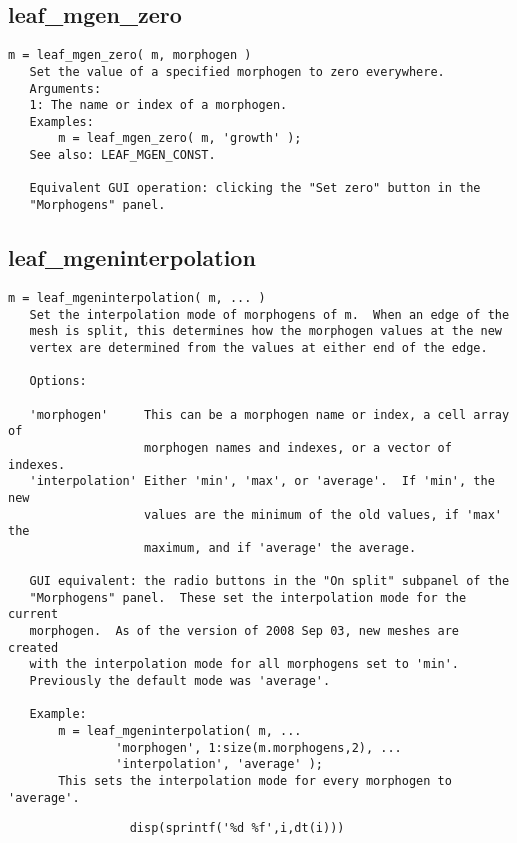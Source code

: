 \subsection{leaf\_mgen\_zero}\label{section-leaf-mgen-zero}

\begin{verbatim}
m = leaf_mgen_zero( m, morphogen )
   Set the value of a specified morphogen to zero everywhere.
   Arguments:
   1: The name or index of a morphogen.
   Examples:
       m = leaf_mgen_zero( m, 'growth' );
   See also: LEAF_MGEN_CONST.

   Equivalent GUI operation: clicking the "Set zero" button in the
   "Morphogens" panel.
\end{verbatim}

\subsection{leaf\_mgeninterpolation}\label{section-leaf-mgeninterpolation}

\begin{verbatim}
m = leaf_mgeninterpolation( m, ... )
   Set the interpolation mode of morphogens of m.  When an edge of the
   mesh is split, this determines how the morphogen values at the new
   vertex are determined from the values at either end of the edge.

   Options:

   'morphogen'     This can be a morphogen name or index, a cell array of
                   morphogen names and indexes, or a vector of indexes.
   'interpolation' Either 'min', 'max', or 'average'.  If 'min', the new
                   values are the minimum of the old values, if 'max' the
                   maximum, and if 'average' the average.

   GUI equivalent: the radio buttons in the "On split" subpanel of the
   "Morphogens" panel.  These set the interpolation mode for the current
   morphogen.  As of the version of 2008 Sep 03, new meshes are created
   with the interpolation mode for all morphogens set to 'min'.
   Previously the default mode was 'average'.

   Example:
       m = leaf_mgeninterpolation( m, ...
               'morphogen', 1:size(m.morphogens,2), ...
               'interpolation', 'average' );
       This sets the interpolation mode for every morphogen to 'average'.
\end{verbatim}

\begin{verbatim}
                 disp(sprintf('%d %f',i,dt(i)))
\end{verbatim}

